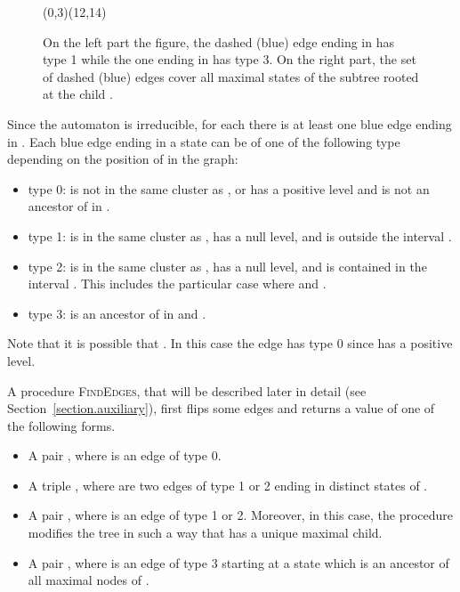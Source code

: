 \documentclass[11pt,a4paper]{article}
\begin{document}
\begin{figure}[htbp]
{\begin{VCPicture}{(0,3)(12,14)}
{
}
\end{VCPicture}}
        \caption{On the left part the figure, the dashed (blue) edge
          ending in  has type 1 while the one ending in  has
          type 3. On the right part, the set  of dashed
          (blue) edges cover all maximal states of the subtree rooted
          at the child .  }\label{figure.tree}
\end{figure}


Since the automaton is irreducible, for each  there is at
least one blue edge ending in . Each blue edge  ending in
a state  can be of one of the following type depending
on the position of  in the graph:
\begin{itemize}
\item type 0:  is not in the same cluster as , or  has a
  positive level and  is not an ancestor of  in .
\item type 1:  is in the same cluster as , has a null level, and
   is outside the interval .
\item type 2:  is in the same cluster as , has a null level, and
   is contained in the interval . This includes the
  particular case where  and .
\item type 3:  is an ancestor of  in  and .
\end{itemize}
Note that it is possible that . In this case the edge 
has type 0 since  has a positive level.

A procedure \textsc{FindEdges}, that will be described later in
detail (see Section~\ref{section.auxiliary}), first flips some edges and returns
a value of one of the following forms.
\begin{itemize} 
\item A pair , where  is an edge of type 0.
\item A triple , where  are two edges of type 1 or 2
  ending in distinct states of .
\item A pair , where  is an edge of type 1 or 2.
Moreover, in this case, the procedure modifies the tree  in such a way
that  has a unique maximal child.
\item A pair , where  is an edge of type 3 starting at a
  state which is an ancestor of all maximal nodes of .
\end{itemize}   
\end{document}
